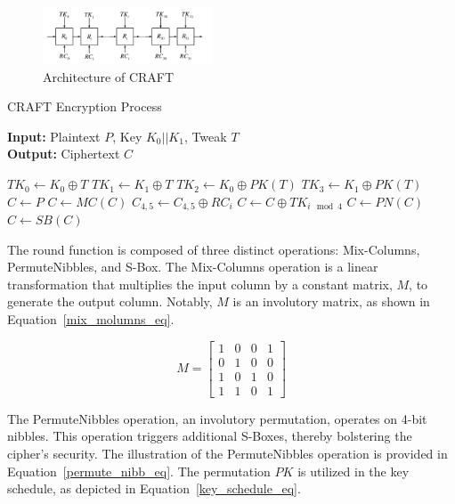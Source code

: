 \documentclass[final,5p,times,twocolumn]{elsarticle}
\begin{document}
\begin{figure}[h]%
    \centering
    \includegraphics[width=0.45\textwidth]{./fig/struct-craft.pdf}
    \caption{Architecture of CRAFT}\label{fig1}
\end{figure}

\begin{algorithm}[h]
    \caption{CRAFT Encryption Process}\label{alg1}
    \textbf{Input:} Plaintext $P$, Key $K_0||K_1$, Tweak $T$ \\
    \textbf{Output:} Ciphertext $C$
    \begin{algorithmic}[1]
        \State $TK_0 \gets K_0\oplus T$
        \State $TK_1 \gets K_1\oplus T$
        \State $TK_2 \gets K_0\oplus PK(T)$
        \State $TK_3 \gets K_1\oplus PK(T)$
        \State $C \gets P$
        \State $C \gets MC(C)$
        \State $C_{4,5} \gets C_{4,5}\oplus RC_i$
        \State $C \gets C \oplus TK_{i\mod 4}$
        \State $C \gets PN(C)$
        \State $C \gets SB(C)$
        \EndIf
        \EndFor
    \end{algorithmic}
\end{algorithm}

The round function is composed of three distinct operations: Mix-Columns, PermuteNibbles, and S-Box.
The Mix-Columns operation is a linear transformation that multiplies the input column by a constant matrix, $M$, to generate the output column. Notably, $M$ is an involutory matrix, as shown in Equation~\ref{mix_molumns_eq}.


\begin{equation}
    M =
    \begin{bmatrix}
        1 & 0 & 0 & 1 \\
        0 & 1 & 0 & 0 \\
        1 & 0 & 1 & 0 \\
        1 & 1 & 0 & 1
    \end{bmatrix}
    \label{mix_molumns_eq}
\end{equation}

The PermuteNibbles operation, an involutory permutation, operates on 4-bit nibbles. This operation triggers additional S-Boxes, thereby bolstering the cipher's security. The illustration of the PermuteNibbles operation is provided in Equation~\ref{permute_nibb_eq}. The permutation $PK$ is utilized in the key schedule, as depicted in Equation~\ref{key_schedule_eq}.
\end{document}

